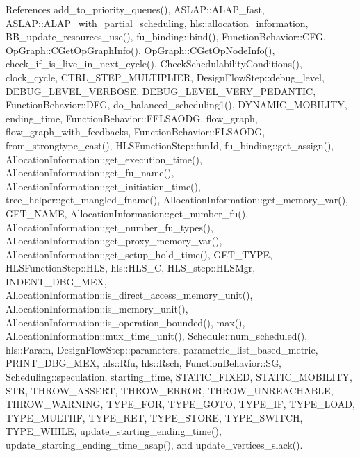 References add\+\_\+to\+\_\+priority\+\_\+queues(), A\+S\+L\+A\+P\+::\+A\+L\+A\+P\+\_\+fast, A\+S\+L\+A\+P\+::\+A\+L\+A\+P\+\_\+with\+\_\+partial\+\_\+scheduling, hls\+::allocation\+\_\+information, B\+B\+\_\+update\+\_\+resources\+\_\+use(), fu\+\_\+binding\+::bind(), Function\+Behavior\+::\+C\+FG, Op\+Graph\+::\+C\+Get\+Op\+Graph\+Info(), Op\+Graph\+::\+C\+Get\+Op\+Node\+Info(), check\+\_\+if\+\_\+is\+\_\+live\+\_\+in\+\_\+next\+\_\+cycle(), Check\+Schedulability\+Conditions(), clock\+\_\+cycle, C\+T\+R\+L\+\_\+\+S\+T\+E\+P\+\_\+\+M\+U\+L\+T\+I\+P\+L\+I\+ER, Design\+Flow\+Step\+::debug\+\_\+level, D\+E\+B\+U\+G\+\_\+\+L\+E\+V\+E\+L\+\_\+\+V\+E\+R\+B\+O\+SE, D\+E\+B\+U\+G\+\_\+\+L\+E\+V\+E\+L\+\_\+\+V\+E\+R\+Y\+\_\+\+P\+E\+D\+A\+N\+T\+IC, Function\+Behavior\+::\+D\+FG, do\+\_\+balanced\+\_\+scheduling1(), D\+Y\+N\+A\+M\+I\+C\+\_\+\+M\+O\+B\+I\+L\+I\+TY, ending\+\_\+time, Function\+Behavior\+::\+F\+F\+L\+S\+A\+O\+DG, flow\+\_\+graph, flow\+\_\+graph\+\_\+with\+\_\+feedbacks, Function\+Behavior\+::\+F\+L\+S\+A\+O\+DG, from\+\_\+strongtype\+\_\+cast(), H\+L\+S\+Function\+Step\+::fun\+Id, fu\+\_\+binding\+::get\+\_\+assign(), Allocation\+Information\+::get\+\_\+execution\+\_\+time(), Allocation\+Information\+::get\+\_\+fu\+\_\+name(), Allocation\+Information\+::get\+\_\+initiation\+\_\+time(), tree\+\_\+helper\+::get\+\_\+mangled\+\_\+fname(), Allocation\+Information\+::get\+\_\+memory\+\_\+var(), G\+E\+T\+\_\+\+N\+A\+ME, Allocation\+Information\+::get\+\_\+number\+\_\+fu(), Allocation\+Information\+::get\+\_\+number\+\_\+fu\+\_\+types(), Allocation\+Information\+::get\+\_\+proxy\+\_\+memory\+\_\+var(), Allocation\+Information\+::get\+\_\+setup\+\_\+hold\+\_\+time(), G\+E\+T\+\_\+\+T\+Y\+PE, H\+L\+S\+Function\+Step\+::\+H\+LS, hls\+::\+H\+L\+S\+\_\+C, H\+L\+S\+\_\+step\+::\+H\+L\+S\+Mgr, I\+N\+D\+E\+N\+T\+\_\+\+D\+B\+G\+\_\+\+M\+EX, Allocation\+Information\+::is\+\_\+direct\+\_\+access\+\_\+memory\+\_\+unit(), Allocation\+Information\+::is\+\_\+memory\+\_\+unit(), Allocation\+Information\+::is\+\_\+operation\+\_\+bounded(), max(), Allocation\+Information\+::mux\+\_\+time\+\_\+unit(), Schedule\+::num\+\_\+scheduled(), hls\+::\+Param, Design\+Flow\+Step\+::parameters, parametric\+\_\+list\+\_\+based\+\_\+metric, P\+R\+I\+N\+T\+\_\+\+D\+B\+G\+\_\+\+M\+EX, hls\+::\+Rfu, hls\+::\+Rsch, Function\+Behavior\+::\+SG, Scheduling\+::speculation, starting\+\_\+time, S\+T\+A\+T\+I\+C\+\_\+\+F\+I\+X\+ED, S\+T\+A\+T\+I\+C\+\_\+\+M\+O\+B\+I\+L\+I\+TY, S\+TR, T\+H\+R\+O\+W\+\_\+\+A\+S\+S\+E\+RT, T\+H\+R\+O\+W\+\_\+\+E\+R\+R\+OR, T\+H\+R\+O\+W\+\_\+\+U\+N\+R\+E\+A\+C\+H\+A\+B\+LE, T\+H\+R\+O\+W\+\_\+\+W\+A\+R\+N\+I\+NG, T\+Y\+P\+E\+\_\+\+F\+OR, T\+Y\+P\+E\+\_\+\+G\+O\+TO, T\+Y\+P\+E\+\_\+\+IF, T\+Y\+P\+E\+\_\+\+L\+O\+AD, T\+Y\+P\+E\+\_\+\+M\+U\+L\+T\+I\+IF, T\+Y\+P\+E\+\_\+\+R\+ET, T\+Y\+P\+E\+\_\+\+S\+T\+O\+RE, T\+Y\+P\+E\+\_\+\+S\+W\+I\+T\+CH, T\+Y\+P\+E\+\_\+\+W\+H\+I\+LE, update\+\_\+starting\+\_\+ending\+\_\+time(), update\+\_\+starting\+\_\+ending\+\_\+time\+\_\+asap(), and update\+\_\+vertices\+\_\+slack().



